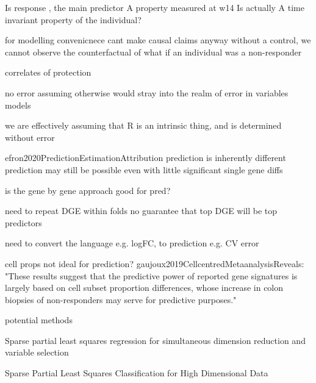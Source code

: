 \begin{outline}
            Is response , the main predictor
            A property measured at w14
            Is actually A time invariant property of the individual?

            for modelling convenicnece
            cant make causal claims anyway
                without a control, we cannot observe the counterfactual of what if an individual was a non-responder

            correlates of protection

            no error
                assuming otherwise would stray into the realm of error in variables models
            
                we are effectively assuming that R is an intrinsic thing, and is determined without error
        
        efron2020PredictionEstimationAttribution
        prediction is inherently different
            prediction may still be possible even with little significant single gene diffs

            is the gene by gene approach good for pred?
        
        need to repeat DGE within folds
            no guarantee that top DGE will be top predictors

        need to convert the language e.g. logFC, to prediction e.g. CV error

        cell props not ideal for prediction?
            gaujoux2019CellcentredMetaanalysisReveals: "These results suggest that the predictive power of reported gene signatures is largely based on cell subset proportion differences, whose increase in colon biopsies of non-responders may serve for predictive purposes."


        potential methods

            Sparse partial least squares regression for simultaneous dimension reduction and variable selection

             Sparse Partial Least Squares Classification for High Dimensional Data 


\end{outline}
